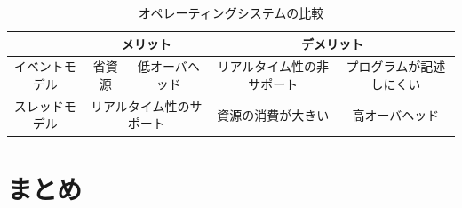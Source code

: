 %



\begin{table}[htb]
  \centering
  \caption{オペレーティングシステムの比較}
  \begin{tabular}{|c||c|c|c|c|} \hline
    \backslashbox{}{} & \multicolumn{2}{|c|}{メリット} & \multicolumn{2}{|c|}{デメリット} \\ \hline \hline
    イベントモデル & 省資源 & 低オーバヘッド & リアルタイム性の非サポート & プログラムが記述しにくい \\ \hline
    スレッドモデル & \multicolumn{2}{|c|}{リアルタイム性のサポート} & 資源の消費が大きい & 高オーバヘッド \\ \hline
  \end{tabular}
  \label{tab:merit_and_demerit}
\end{table}



%
%
%



\section{まとめ}


